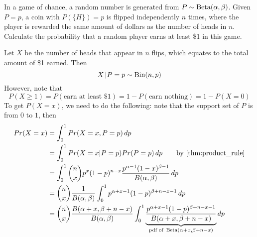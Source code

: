 \documentclass[notoc,notitlepage]{tufte-book}
\begin{document}
\begin{eg}[Example 3.15]
  In a game of chance, a random number is generated from $P \sim \operatorname{Beta}( \alpha, \beta )$. Given $P = p$, a coin with $P( \{H\} ) = p$ is flipped independently $n$ times, where the player is rewarded the same amount of dollars as the number of heads in $n$. Calculate the probability that a random player earns at least \$1 in this game.

  \begin{solution}
    Let $X$ be the number of heads that appear in $n$ flips, which equates to the total amount of \$1 earned. Then
    \begin{equation*}
      X \, | P = p \sim \operatorname{Bin}(n, p)
    \end{equation*}
    However, note that
    \begin{equation*}
      P (X \geq 1) = P(\text{earn at least \$1}) = 1 - P(\text{earn nothing}) = 1 - P(X = 0)
    \end{equation*}
    To get $P(X = x)$, we need to do the following: note that the support set of $P$ is from $0$ to $1$, then
    \begin{align*}
    Pr(X = x) &= \int_{0}^{1} Pr(X = x, P = p) \dif{p} \\
           &= \int_{0}^{1} Pr(X = x | P = p) Pr(P = p) \dif{p} \qquad \text{by } \cref{thm:product_rule} \\
           &= \int_{0}^{1} \binom{n}{x} p^x (1 - p)^{n - x} \frac{p^{\alpha - 1} (1 - x)^{\beta - 1} }{B(\alpha, \beta)} \dif{p} \\ 
           &= \binom{n}{x} \frac{1}{B(\alpha, \beta)} \int_{0}^{1} p^{\alpha + x  -1} (1 - p)^{\beta + n - x - 1} \dif{p} \\
           &= \binom{n}{x} \frac{B(\alpha + x , \beta + n - x)}{B(\alpha, \beta)} \int_{0}^{1} \underbrace{ \frac{p^{\alpha + x - 1} (1 - p)^{\beta + n - x - 1}}{B (\alpha + x, \beta + n - x)} }_{\text{pdf of } \BetaDist(\alpha + x, \beta + n - x)} \dif{p} \\

\end{align*}
\end{solution}
\end{eg}
\end{document}
